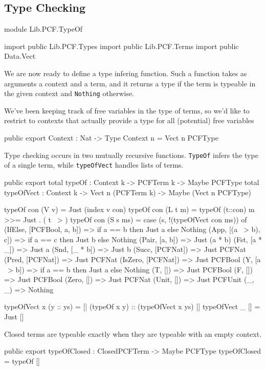 \subsection{Type Checking}

\begin{hidden}
module Lib.PCF.TypeOf

import public Lib.PCF.Types
import public Lib.PCF.Terms
import public Data.Vect
\end{hidden}

We are now ready to define a type infering function. Such a function takes as
arguments a context and a term, and it returns a type if the term is typeable in
the given context and \lstinline{Nothing} otherwise.

We've been keeping track of free variables in the type of terms,
so we'd like to restrict to contexts that actually provide a type for all (potential) free variables

\begin{code}
public export
Context : Nat -> Type
Context n = Vect n PCFType
\end{code}

Type checking occurs in two mutually recursive functions. \lstinline{TypeOf} infers the type of a single term,
while \lstinline{typeOfVect} handles lists of terms.

\begin{code}
public export
total typeOf : Context k -> PCFTerm k -> Maybe PCFType
total typeOfVect : Context k -> Vect n (PCFTerm k) -> Maybe (Vect n PCFType)

typeOf con (V v)      = Just (index v con)
typeOf con (L t m)    = typeOf (t::con) m >>= Just . ( t ~> )
typeOf con (S s ms)   = case (s,  !(typeOfVect con ms)) of
  (IfElse,  [PCFBool, a, b]) => if a == b
                                  then Just a
                                else Nothing
  (App,     [(a ~> b), c])   => if a == c
                                  then Just b
                                else Nothing
  (Pair,    [a, b])          => Just (a * b)
  (Fst,     [a * _])         => Just a
  (Snd,     [_ * b])         => Just b
  (Succ,    [PCFNat])        => Just PCFNat
  (Pred,    [PCFNat])        => Just PCFNat
  (IsZero,  [PCFNat])        => Just PCFBool
  (Y,       [a ~> b])        => if a == b
                                  then Just a
                                else Nothing
  (T,       [])              => Just PCFBool
  (F,       [])              => Just PCFBool
  (Zero,    [])              => Just PCFNat
  (Unit,    [])              => Just PCFUnit
  (_, _)                     => Nothing

typeOfVect x (y :: ys) = [| (typeOf x y) :: (typeOfVect x ys) |]
typeOfVect _ []        = Just []
\end{code}

Closed terms are typeable exactly when they are typeable with an empty context.

\begin{code}
public export
typeOfClosed : ClosedPCFTerm -> Maybe PCFType
typeOfClosed = typeOf []
\end{code}

